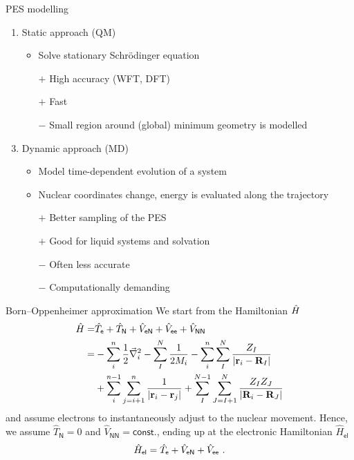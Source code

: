 \documentclass[t]{beamer}
\begin{document}
	\begin{frame}{PES modelling}
	    \begin{enumerate}
	        \item Static approach (QM)
	        \begin{itemize}
	            \item Solve stationary Schrödinger equation
	            \item[$+$] High accuracy (WFT, DFT)
	            \item[$+$] Fast
	            \item[$-$] Small region around (global) minimum geometry is modelled
	        \end{itemize}
	        \item[]
	        
	        \item Dynamic approach (MD)
	        \begin{itemize}
	            \item Model time-dependent evolution of a system
	            \item Nuclear coordinates change, energy is evaluated along the trajectory
	            \item[$+$] Better sampling of the PES
	            \item[$+$] Good for liquid systems and solvation
	            \item[$-$] Often less accurate
	            \item[$-$] Computationally demanding
	        \end{itemize}
	    \end{enumerate}
	\end{frame}
	\begin{frame}{Born--Oppenheimer approximation}
	    We start from the Hamiltonian $\Hat{H}$ 
	    \begin{align*}
	        \Hat{H} = & \Hat{T}_\mathsf{e} + \Hat{T}_\mathsf{N} + \Hat{V}_\mathsf{eN} + \Hat{V}_\mathsf{ee} + \Hat{V}_\mathsf{NN} \\ 
	         = & - \sum_i^n \frac{1}{2} \vec{\nabla}_i^2 - \sum_I^N \frac{1}{2M_i} - \sum_i^n \sum_I^N \frac{Z_I}{\left| \mathbf{r}_i-\mathbf{R}_I \right|} \\
	         & + \sum_i^{n-1} \sum_{j=i+1}^n \frac{1}{\left| \mathbf{r}_i-\mathbf{r}_j \right|} + \sum_I^{N-1} \sum_{J=I+1}^N \frac{Z_I Z_J}{\left| \mathbf{R}_i-\mathbf{R}_J \right|} \\
	    \end{align*}
	    and assume electrons to instantaneously adjust to the nuclear movement. Hence, we assume $\hat{T}_\mathsf{N}=0$ and $\hat{V}_\mathsf{NN}=\mathsf{const.}$, ending up at the electronic Hamiltonian $\hat{H}_\mathsf{el}$ 
	    \begin{equation*}
	        \hat{H}_\mathsf{el} = \Hat{T}_\mathsf{e} + \Hat{V}_\mathsf{eN} + \Hat{V}_\mathsf{ee}~.
	    \end{equation*}
	\end{frame}
\end{document}
